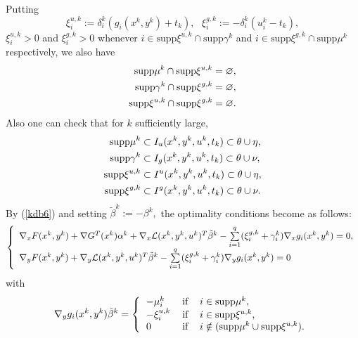 	Putting
	\begin{equation}
	\xi_{i}^{u,k}:=\delta_{i}^{k}(g_{i}(x^{k},y^{k})+t_{k}),\text{ \ \ \ }\xi
	_{i}^{g,k}:=-\delta_{i}^{k}(u_{i}^{k}-t_{k}), \label{kdb6}
	\end{equation}
	 $\xi_{i}^{u,k}>0$ and $\xi_{i}^{g,k}>0$ whenever $i\in
	\mathrm{supp}\xi^{u,k}\cap\mathrm{supp}\gamma^{k}$ and $i\in\mathrm{supp}
	\xi^{g,k}\cap\mathrm{supp}\mu^{k}$ respectively, we also have 
	\begin{align}
	\mathrm{supp}\mu^{k}\cap\mathrm{supp}\xi^{u,k}  & =\varnothing,\medskip
	\label{kd11}\\
	\mathrm{supp}\gamma^{k}\cap\mathrm{supp}\xi^{g,k}  & =\varnothing
	,\medskip\label{kd12}\\
	\mathrm{supp}\xi^{u,k}\cap\mathrm{supp}\xi^{g,k}  & =\varnothing.\label{kd13}%
	\end{align}
	Also one can check that for $k$ sufficiently large,
	\begin{align}
	\mathrm{supp}\mu^{k} &  \subset I_{u}(x^{k},y^{k},u^{k},t_{k})\subset
	\theta\cup\eta,\medskip\label{k7}\\
	\mathrm{supp}\gamma^{k} &  \subset I_{g}(x^{k},y^{k},u^{k},t_{k})\subset
	\theta\cup\nu,\medskip\label{k8}\\
	\mathrm{supp}\xi^{u,k} &  \subset I^{u}(x^{k},y^{k},u^{k},t_{k})\subset
	\theta\cup\eta,\medskip\label{k9}\\
	\mathrm{supp}\xi^{g,k} &  \subset I^{g}(x^{k},y^{k},u^{k},t_{k})\subset
	\theta\cup\nu.\label{k10}
	\end{align}
	By (\ref{kdb6}) and setting $\tilde{\beta}^{k}:=-\beta^{k},$ the optimality
	conditions become as follows:
	\begin{equation}
	\left\{
	\begin{array}
	[c]{c}%
	\nabla_{x}F(x^{k},y^{k})+\nabla G^{T}(x^{k})\alpha^{k}+\nabla_{x}
	\mathcal{L}(x^{k},y^{k},u^{k})^{T}\tilde{\beta}^{k}-\sum\limits_{i=1}^{q}
	(\xi_{i}^{g,k}+\gamma_{i}^{k})\nabla_{x}g_{i}(x^{k},y^{k})=0,\\[1ex]
	\multicolumn{1}{l}{\nabla_{y}F(x^{k},y^{k})+\nabla_{y}\mathcal{L}(x^{k}
		,y^{k},u^{k})^{T}\tilde{\beta}^{k}-\sum\limits_{i=1}^{q}(\xi_{i}^{g,k}
		+\gamma_{i}^{k})\nabla_{y}g_{i}(x^{k},y^{k})=0}
	\end{array}
	\right. \label{kd16}
	\end{equation}
	with%
	\begin{equation}
	\nabla_{y}g_{i}(x^{k},y^{k})\tilde{\beta}^{k}=\left\{
	\begin{tabular}
	[c]{lll}%
	$-\mu_{i}^{k}$ & if & $i\in\mathrm{supp}\mu^{k}$,\\
	$-\xi_{i}^{u,k}$ & if & $i\in\mathrm{supp}\xi^{u,k}$,\\
	$0$ & if & $i\notin(\mathrm{supp}\mu^{k}\cup\mathrm{supp}\xi^{u,k}).$
	\end{tabular}
	\right. \label{kd17}
	\end{equation}
